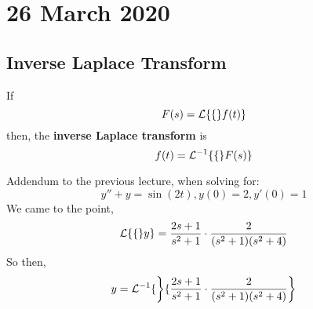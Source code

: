 \documentclass[diffeq.tex]{subfiles}
\begin{document}
\chapter{26 March 2020}
    \section{Inverse Laplace Transform}
    \begin{definition}
        If
        \begin{equation}
            F(s) = \mathcal{L}\{\{\}f(t)\}
        \end{equation}
        then, the \textbf{inverse Laplace transform} is
        \begin{equation}
            f(t) = \mathcal{L}^{-1}\{\{\}F(s)\}
        \end{equation}
    \end{definition}
    Addendum to the previous lecture, when solving for:
    \begin{equation}
        y'' + y = \sin(2t), y(0) = 2, y'(0) = 1
    \end{equation}
    We came to the point,
    \begin{equation}
        \mathcal{L}\{\{\}y\} = \frac{2s + 1}{s^{2} + 1}\cdot\frac{2}{(s^{2} + 1)(s^{2} + 4)}
    \end{equation}
    So then,
    \begin{equation}
        y = \mathcal{L}^{-1}\{\left\}\{\frac{2s + 1}{s^{2} + 1}\cdot\frac{2}{(s^{2} + 1)(s^{2} + 4)}\right\}
    \end{equation}
\end{document}
